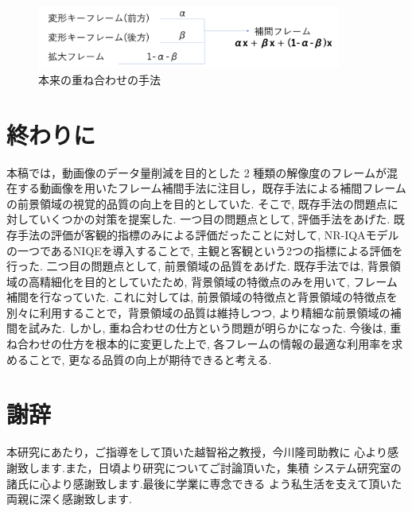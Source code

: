 \documentclass[a4paper,12pt]{jsreport}
\begin{document}
\begin{figure}[h]
  \begin{center}
    \includegraphics[width=10cm]{./honrai_kasaneawase.png}
    \caption{本来の重ね合わせの手法}
  \end{center}
\end{figure}


\chapter{終わりに}
本稿では，動画像のデータ量削減を目的とした 2 種類の解像度のフレームが混在する動画像を用いたフレーム補間手法に注目し，既存手法による補間フレームの前景領域の視覚的品質の向上を目的としていた. そこで, 既存手法の問題点に対していくつかの対策を提案した. 一つ目の問題点として, 評価手法をあげた. 既存手法の評価が客観的指標のみによる評価だったことに対して, NR-IQAモデルの一つであるNIQEを導入することで, 主観と客観という2つの指標による評価を行った. 二つ目の問題点として, 前景領域の品質をあげた. 既存手法では, 背景領域の高精細化を目的としていたため, 背景領域の特徴点のみを用いて, フレーム補間を行なっていた. これに対しては, 前景領域の特徴点と背景領域の特徴点を別々に利用することで，背景領域の品質は維持しつつ, より精細な前景領域の補間を試みた. しかし, 重ね合わせの仕方という問題が明らかになった. 
今後は, 重ね合わせの仕方を根本的に変更した上で, 各フレームの情報の最適な利用率を求めることで, 更なる品質の向上が期待できると考える. 



\chapter*{謝辞}
本研究にあたり，ご指導をして頂いた越智裕之教授，今川隆司助教に 心より感謝致します.また，日頃より研究についてご討論頂いた，集積 システム研究室の諸氏に心より感謝致します.最後に学業に専念できる よう私生活を支えて頂いた両親に深く感謝致します.


\end{document}

